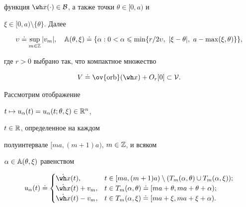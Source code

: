 функция $\wh x(\cdot)\in\cal B$, а также точки $\theta\in[0,a)$ и


$\xi\in[0,a)\setminus\{\theta\}$. Далее


\begin{equation}


\upsilon\doteq \sup_{m\in{\Bbb Z}}|v_m|,


\quad \Bbb A(\theta,\xi)\doteq \{\alpha:


0<\alpha\leqslant\min\{r/2\upsilon,\ |\xi-\theta|,


\ a-\max(\xi,\theta)\}\},


\end{equation}


где $r>0$ выбрано так, что компактное множество


\begin{equation}


V\doteq \ov{\orb}(\wh x)+O_{r}[0]\subset\cal V.


\end{equation}





Рассмотрим отображение


$t\mapsto u_\alpha(t)=u_\alpha(t;\theta,\xi)\in\Bbb R^n$,


$t\in\Bbb R$, определенное на каждом


полуинтервале $[ma,(m+1)a)$, $m\in{\Bbb Z}$, и всяком


$\alpha\in{\Bbb A}(\theta,\xi)$ равенством


\begin{equation}


u_{\alpha}(t)\doteq\begin{cases}


\Dot{\wh x}(t), &


t\in[ma,(m+1)a)\setminus(T_m(\alpha,\theta)\cup T_m(\alpha,\xi)); \\


\Dot{\wh x}(t)+v_m, & t\in T_m(\alpha,\theta)\doteq


[ma+\theta,ma+\theta+\alpha); \\


\Dot{\wh x}(t)-v_m, & t\in T_m(\alpha,\xi)\doteq


[ma+\xi,ma+\xi+\alpha).


\end{cases}


\end{equation}





